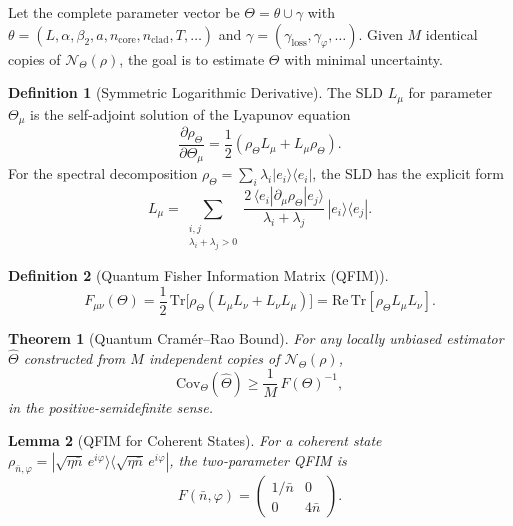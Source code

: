 \documentclass[journal,twocolumn]{IEEEtran}
\theoremstyle{definition}
\newtheorem{definition}{Definition}[section]
\theoremstyle{plain}
\newtheorem{theorem}{Theorem}[section]
\newtheorem{lemma}[theorem]{Lemma}
\newcommand{\Tr}{\mathrm{Tr}}
\begin{document}
Let the complete parameter vector be $\Theta = \theta \cup \gamma$
with $\theta = (L,\alpha,\beta_2,a,n_{\mathrm{core}},
n_{\mathrm{clad}},T,\ldots)$ and $\gamma = (\gamma_{\mathrm{loss}},
\gamma_\varphi, \ldots)$.  Given $M$ identical copies of
$\mathcal{N}_\Theta(\rho)$, the goal is to estimate $\Theta$ with
minimal uncertainty.

\begin{definition}[Symmetric Logarithmic Derivative]
The SLD $L_\mu$ for parameter $\Theta_\mu$ is the self-adjoint
solution of the Lyapunov equation
\begin{equation}
  \frac{\partial \rho_\Theta}{\partial \Theta_\mu}
  = \frac{1}{2}(\rho_\Theta L_\mu + L_\mu \rho_\Theta).
  \label{eq:sld_def}
\end{equation}
For the spectral decomposition $\rho_\Theta =
\sum_i \lambda_i |e_i\rangle\langle e_i|$, the SLD has the explicit form
\begin{equation}
  L_\mu = \sum_{\substack{i,j \\ \lambda_i + \lambda_j > 0}}
  \frac{2\,\langle e_i|\partial_\mu\rho_\Theta|e_j\rangle}
       {\lambda_i + \lambda_j}\,|e_i\rangle\langle e_j|.
  \label{eq:SLD}
\end{equation}
\end{definition}

\begin{definition}[Quantum Fisher Information Matrix (QFIM)]
\begin{equation}
  F_{\mu\nu}(\Theta) = \frac{1}{2}\,\Tr\bigl[\rho_\Theta
    (L_\mu L_\nu + L_\nu L_\mu)\bigr]
  = \mathrm{Re}\,\Tr[\rho_\Theta L_\mu L_\nu].
  \label{eq:QFIM}
\end{equation}
\end{definition}

\begin{theorem}[Quantum Cram\'{e}r--Rao Bound]
\label{thm:QCRB}
For any locally unbiased estimator $\hat\Theta$ constructed from
$M$ independent copies of $\mathcal{N}_\Theta(\rho)$,
\begin{equation}
  \mathrm{Cov}_\Theta(\hat\Theta) \ge \frac{1}{M}\,F(\Theta)^{-1},
  \label{eq:QCRB}
\end{equation}
in the positive-semidefinite sense.
\end{theorem}

\begin{lemma}[QFIM for Coherent States]
\label{lem:qfim_coherent}
For a coherent state $\rho_{\bar n, \varphi} =
|\sqrt{\eta\bar n}\,e^{i\varphi}\rangle
\langle\sqrt{\eta\bar n}\,e^{i\varphi}|$, the two-parameter QFIM is
\begin{equation}
  F(\bar n, \varphi) =
  \begin{pmatrix} 1/\bar n & 0 \\ 0 & 4\bar n \end{pmatrix}.
  \label{eq:qfim_coherent}
\end{equation}
\end{lemma}
\end{document}
